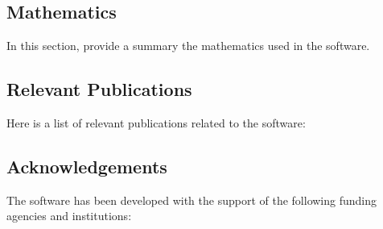 \subsection{Mathematics}
\label{sec:\VAR{software.name}:mathematics}

In this section, provide a summary the mathematics used in the software.


\subsection{Relevant Publications}
\label{sec:\VAR{software.name}:publications}

Here is a list of relevant publications related to the software:


\subsection{Acknowledgements}
\label{sec::\VAR{software.name}:acknowledgements}

The software has been developed with the support of the following funding agencies and institutions: 







